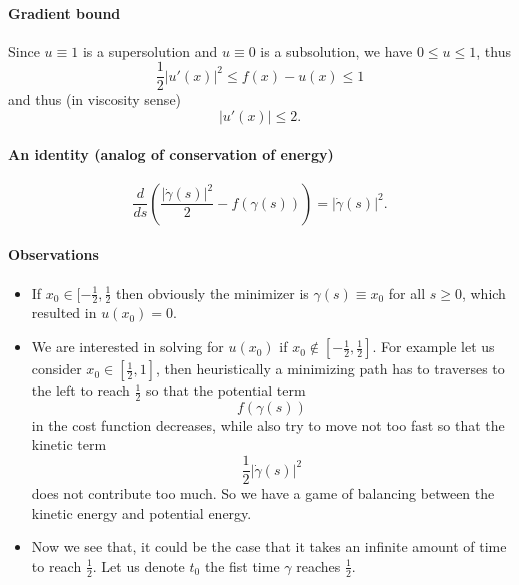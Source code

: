 \documentclass[english,reqno]{amsart}
\begin{document}
\paragraph{\textbf{Gradient bound}} Since $u\equiv 1$ is a supersolution and $u\equiv 0$ is a subsolution, we have $0\leq u\leq 1$, thus
\begin{equation*}
    \frac{1}{2}|u'(x)|^2 \leq f(x) - u(x) \leq 1
\end{equation*}
and thus (in viscosity sense)
\begin{equation*}
    |u'(x)| \leq 2.
\end{equation*}
\paragraph{\textbf{An identity (analog of conservation of energy)}} 
\begin{equation*}
    \frac{d}{ds}\left(\frac{|\dot{\gamma}(s)|^2}{2} - f(\gamma(s))\right) = |\dot{\gamma}(s)|^2.
\end{equation*}


\paragraph{\textbf{Observations}}
\begin{itemize}
    \item If $x_0\in [-\frac{1}{2},\frac{1}{2}$ then obviously the minimizer is $\gamma(s) \equiv x_0$ for all $s\geq 0$, which resulted in $u(x_0) = 0$.
    \item We are interested in solving for $u(x_0)$ if $x_0\notin [-\frac{1}{2},\frac{1}{2}]$. For example let us consider $x_0 \in [\frac{1}{2},1]$, then heuristically a minimizing path has to traverses to the left to reach $\frac{1}{2}$ so that the potential term
    \begin{equation*}
        f(\gamma(s))    
    \end{equation*}
    in the cost function decreases, while also try to move not too fast so that the kinetic term
    \begin{equation*}
        \frac{1}{2}|\dot{\gamma}(s)|^2
    \end{equation*} 
    does not contribute too much. So we have a game of balancing between the kinetic energy and potential energy.
    \item Now we see that, it could be the case that it takes an infinite amount of time to reach $\frac{1}{2}$. Let us denote $t_0$ the fist time $\gamma$ reaches $\frac{1}{2}$.
\end{itemize}
\end{document}
